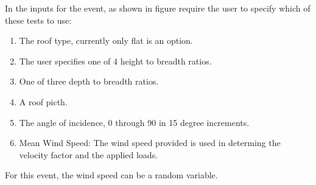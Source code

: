 In the inputs for the event, as shown in figure  require the user to specify which 
of these tests to use:
\begin{enumerate} 
\item The roof type, currently only flat is an option.
\item The user specifies one of 4 height to breadth ratios.
\item One of three depth to breadth ratios.
\item A roof picth.
\item The angle of incidence, 0 through 90 in 15 degree increments.
\item Mean Wind Speed: The wind speed provided is used in determing the velocity factor and the applied loads. 
\end{enumerate}

For this event, the wind speed can be a random variable.
